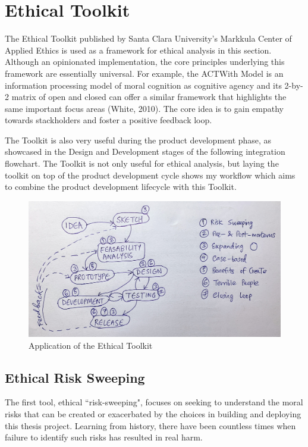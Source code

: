 \documentclass{article}
\begin{document}
\section{Ethical Toolkit}

The Ethical Toolkit published by Santa Clara University's Markkula Center of Applied Ethics is used as a framework for ethical analysis in this section. Although an opinionated implementation, the core principles underlying this framework are essentially universal. For example, the ACTWith Model is an information processing model of moral cognition as cognitive agency and its 2-by-2 matrix of open and closed can offer a similar framework that highlights the same important focus areas (White, 2010). The core idea is to gain empathy towards stackholders and foster a positive feedback loop.

The Toolkit is also very useful during the product development phase, as showcased in the Design and Development stages of the following integration flowchart. The Toolkit is not only useful for ethical analysis, but laying the toolkit on top of the product development cycle shows my workflow which aims to combine the product development lifecycle with this Toolkit.

\begin{figure}[h]
 \centering
 \includegraphics[width=1\textwidth]{cycle.jpg}
 \caption{Application of the Ethical Toolkit}
 \label{fig:checkbox}
\end{figure}

\subsection{Ethical Risk Sweeping}

The first tool, ethical ``risk-sweeping", focuses on seeking to understand the moral risks that can be created or exacerbated by the choices in building and deploying this thesis project. Learning from history, there have been countless times when failure to identify such risks has resulted in real harm.
\end{document}
